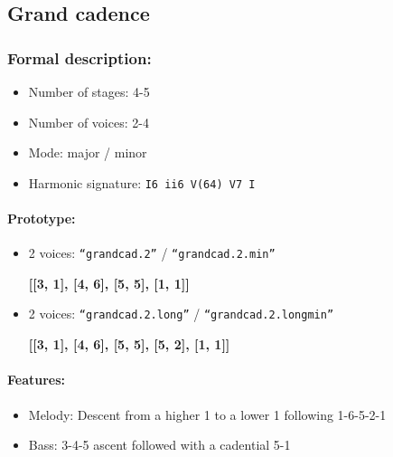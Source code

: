 ﻿\documentclass[11pt, openany]{article}
\begin{document}
	\subsection{Grand cadence}
	
\subsubsection{Formal description:}
\begin{itemize}
\item Number of stages: 4-5
\item Number of voices: 2-4
\item Mode: major / minor
\item Harmonic signature: \texttt{I6 ii6 V(64) V7 I}
\end{itemize}

\paragraph{Prototype:}
\begin{itemize}
\item 2 voices: \texttt{“grandcad.2”} / \texttt{“grandcad.2.min”}
	\begin{center}
	\textbf{[[3, 1], [4, 6], [5, 5], [1, 1]]}
	\end{center}
\item 2 voices: \texttt{“grandcad.2.long”} / \texttt{“grandcad.2.longmin”}
	\begin{center}
	\textbf{[[3, 1], [4, 6], [5, 5], [5, 2], [1, 1]]}
	\end{center}
\end{itemize}

\paragraph{Features:}
\begin{itemize}
\item Melody: Descent from a higher 1 to a lower 1 following 1-6-5-2-1
\item Bass: 3-4-5 ascent followed with a cadential 5-1
\end{itemize}
\end{document}
